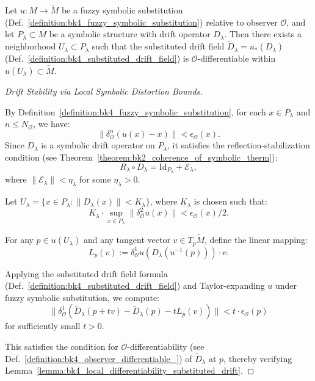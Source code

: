 \begin{lemma}
\label{lemma:bk4_local_differentiability_substituted_drift}
Let $u : M \to \tilde{M}$ be a fuzzy symbolic substitution (Def.~\ref{definition:bk4_fuzzy_symbolic_substitution}) relative to observer $\mathcal{O}$, and let $P_\lambda \subset M$ be a symbolic structure with drift operator $D_\lambda$. Then there exists a neighborhood $U_\lambda \subset P_\lambda$ such that the substituted drift field $\tilde{D}_\lambda = u_*(D_\lambda)$ (Def.~\ref{definition:bk4_substituted_drift_field}) is $\mathcal{O}$-differentiable within $u(U_\lambda) \subset \tilde{M}$.
\end{lemma}
\begin{proof}[Drift Stability via Local Symbolic Distortion Bounds]
\label{proof:bk4_drift_stability_local_bounds}
\leavevmode

By Definition~\ref{definition:bk4_fuzzy_symbolic_substitution}, for each $x \in P_\lambda$ and $n \leq N_\mathcal{O}$, we have:
\[
\| \delta^n_\mathcal{O}(u(x) - x) \| < \epsilon_\mathcal{O}(x).
\]
Since $D_\lambda$ is a symbolic drift operator on $P_\lambda$, it satisfies the reflection-stabilization condition (see Theorem~\ref{theorem:bk2_coherence_of_symbolic_therm}):
\[
R_\lambda \circ D_\lambda = \text{Id}_{P_\lambda} + \mathcal{E}_\lambda,
\]
where $\|\mathcal{E}_\lambda\| < \eta_\lambda$ for some $\eta_\lambda > 0$.

Let $U_\lambda = \{x \in P_\lambda : \|D_\lambda(x)\| < K_\lambda\}$, where $K_\lambda$ is chosen such that:
\[
K_\lambda \cdot \sup_{x \in P_\lambda}\|\delta^2_\mathcal{O}u(x)\| < \epsilon_\mathcal{O}(x)/2.
\]

For any $p \in u(U_\lambda)$ and any tangent vector $v \in T_p\tilde{M}$, define the linear mapping:
\[
L_p(v) := \delta^1_\mathcal{O}u(D_\lambda(u^{-1}(p))) \cdot v.
\]

Applying the substituted drift field formula (Def.~\ref{definition:bk4_substituted_drift_field}) and Taylor-expanding $u$ under fuzzy symbolic substitution, we compute:
\[
\|\delta^1_\mathcal{O}(\tilde{D}_\lambda(p+tv) - \tilde{D}_\lambda(p) - tL_p(v))\| < t \cdot \epsilon_\mathcal{O}(p)
\]
for sufficiently small $t > 0$.

This satisfies the condition for $\mathcal{O}$-differentiability (see Def.~\ref{definition:bk4_observer_differentiable_}) of $\tilde{D}_\lambda$ at $p$, thereby verifying Lemma~\ref{lemma:bk4_local_differentiability_substituted_drift}.
\end{proof}

